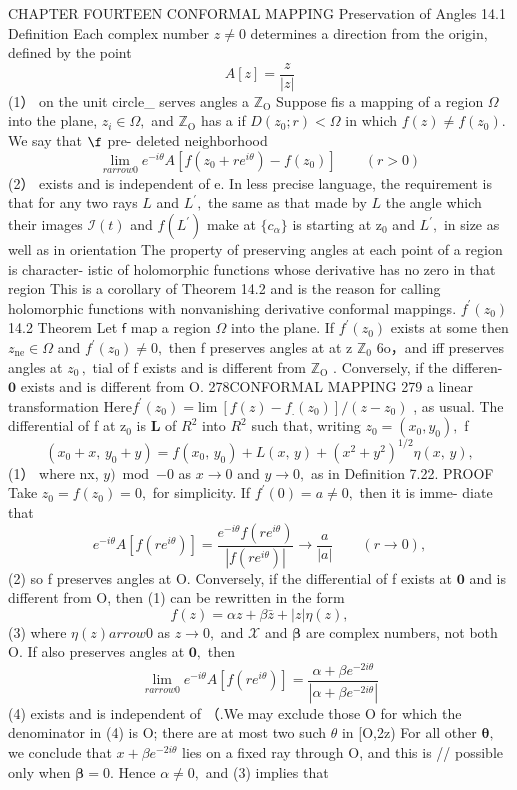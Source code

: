 CHAPTER FOURTEEN CONFORMAL MAPPING Preservation of Angles 14.1 Definition Each complex number $z\neq0$ determines a direction from the origin, defined by the point $$ A[z]={\frac{z}{|z|}} $$ (1） on the unit circle_ serves angles a $\mathbb{Z}_{\mathrm{O}}$ Suppose fis a mapping of a region $\Omega$ into the plane, $z_{i}\in\Omega,$ and $\mathbb{Z}_{\mathrm{O}}$ has a if $D(z_{0};r)<\Omega$ in which $f(z)\neq f(z_{0}).$ We say that $\boldsymbol{\f}$ pre- deleted neighborhood $$ \operatorname*{lim}_{r arrow0}e^{-i\theta}A[f(z_{0}+r e^{i\theta})-f(z_{0})]\qquad(r>0) $$ (2） exists and is independent of e. In less precise language, the requirement is that for any two rays $\boldsymbol{\mathit{L}}$ and $L^{\prime},$ the same as that made by $\boldsymbol{\mathit{L}}$ the angle which their images $\scriptstyle{\mathcal{I}}(t)$ and $f(L^{\prime})$ make at $\scriptstyle\{c_{\alpha}\}$ is starting at $\mathrm{z}_{\mathrm{0}}$ and $L^{\prime},$ in size as well as in orientation The property of preserving angles at each point of a region is character- istic of holomorphic functions whose derivative has no zero in that region This is a corollary of Theorem 14.2 and is the reason for calling holomorphic functions with nonvanishing derivative conformal mappings. $f^{\prime}(z_{0})$ 14.2 Theorem Let $\boldsymbol{\mathsf{f}}$ map a region $\Omega$ into the plane. If $f^{\prime}(z_{0})$ exists at some then $\scriptstyle z_{\mathrm{ne}}\in\Omega$ and $f^{\prime}(z_{0})\neq0,$ then f preserves angles at at z $\mathbb{Z}_{0}$ 6o，and iff preserves angles at $z_{0}\,,$ tial of f exists and is different from $\mathbb{Z}_{\mathrm{O}}$ . Conversely, if the differen- $\mathbf{0}$ exists and is different from O. 278CONFORMAL MAPPING 279 a linear transformation $\mathrm{Here}f^{\prime}(z_{0})=\mathrm{lim~}[f(z)-f_{.}(z_{0})]/(z-z_{0})$ , as usual. The differential of f at $\mathrm{z}_{0}$ is ${\boldsymbol{L}}$ of $R^{2}$ into $R^{2}$ such that, writing $z_{0}=(x_{0},y_{0}),$ f $$ (x_{0}+x,\,y_{0}+y)=f(x_{0},\,y_{0})+L(x,\,y)+(x^{2}+y^{2})^{1/2}\eta(x,\,y), $$ (1） where nx, $y){\bmod{-0}}$ as $x\to0$ and $y\to0,$ as in Definition 7.22. PROOF Take $z_{0}=f(z_{0})=0,$ for simplicity. If $f^{\prime}(0)=a\neq0,$ then it is imme- diate that $$ e^{-i\theta}A[f(r e^{i\theta})]=\frac{e^{-i\theta}f(r e^{i\theta})}{|f(r e^{i\theta})|}\to\frac{a}{|a|}\quad\quad(r\to0), $$ (2) so f preserves angles at O. Conversely, if the differential of f exists at $\mathbf{0}$ and is different from O, then (1) can be rewritten in the form $$ f(z)=\alpha z+\beta\bar{z}+|z|\eta(z), $$ (3) where $\scriptstyle\eta(z) arrow0$ as $\scriptstyle z\to0,$ and $\scriptstyle{\mathcal{X}}$ and $\boldsymbol{\beta}$ are complex numbers, not both O. If also preserves angles at ${\boldsymbol{0}},$ then $$ \operatorname*{lim}_{r arrow0}e^{-i\theta}A[f(r e^{i\theta})]=\frac{\alpha+\beta e^{-2i\theta}}{|\alpha+\beta e^{-2i\theta}|} $$ (4) exists and is independent of （.We may exclude those O for which the denominator in (4) is O; there are at most two such $\theta$ in [O,2z) For all other ${\boldsymbol{\theta}},$ we conclude that $x+\beta e^{-2i\theta}$ lies on a fixed ray through O, and this is // possible only when ${\boldsymbol{\beta}}=0.$ Hence $\alpha\neq0,$ and (3) implies that 